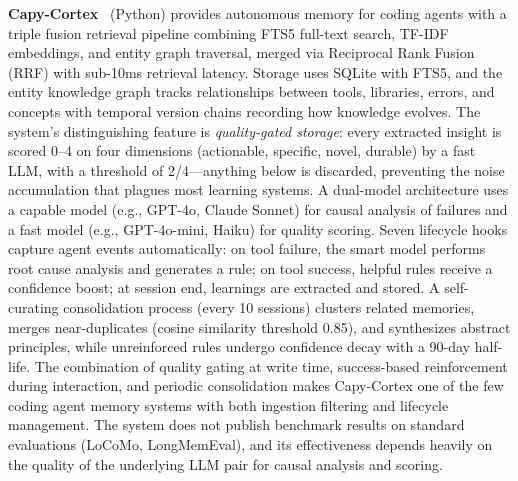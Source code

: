 \textbf{Capy-Cortex}~\cite{capycortex2026} (Python) provides autonomous
memory for coding agents with a triple fusion retrieval pipeline
combining FTS5 full-text search, TF-IDF embeddings, and entity graph
traversal, merged via Reciprocal Rank Fusion (RRF) with sub-10ms
retrieval latency.  Storage uses SQLite with FTS5, and the entity
knowledge graph tracks relationships between tools, libraries, errors,
and concepts with temporal version chains recording how knowledge
evolves.  The system's distinguishing feature is \emph{quality-gated
storage}: every extracted insight is scored 0--4 on four dimensions
(actionable, specific, novel, durable) by a fast LLM, with a threshold
of 2/4---anything below is discarded, preventing the noise accumulation
that plagues most learning systems.  A dual-model architecture uses a
capable model (e.g., GPT-4o, Claude Sonnet) for causal analysis of
failures and a fast model (e.g., GPT-4o-mini, Haiku) for quality
scoring.  Seven lifecycle hooks capture agent events automatically: on
tool failure, the smart model performs root cause analysis and generates
a rule; on tool success, helpful rules receive a confidence boost; at
session end, learnings are extracted and stored.  A self-curating
consolidation process (every 10 sessions) clusters related memories,
merges near-duplicates (cosine similarity threshold 0.85), and
synthesizes abstract principles, while unreinforced rules undergo
confidence decay with a 90-day half-life.  The combination of quality
gating at write time, success-based reinforcement during interaction, and
periodic consolidation makes Capy-Cortex one of the few coding agent
memory systems with both ingestion filtering and lifecycle management.
The system does not publish benchmark results on standard evaluations
(LoCoMo, LongMemEval), and its effectiveness depends heavily on the
quality of the underlying LLM pair for causal analysis and scoring.


